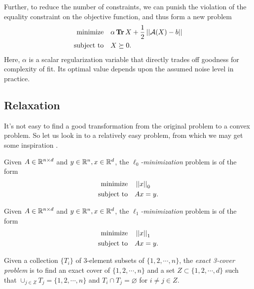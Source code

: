 \documentclass[11pt]{article}
\begin{document}
Further, to reduce the number of constraints, we can punish the violation of the equality constraint on the objective function, and thus form a new problem
\[\begin{aligned}
    \textnormal{minimize}\quad & \alpha\operatorname{\mathbf{Tr}} X+\frac12\left|\left|\mathcal A(X)-b\right|\right|\\
    \textnormal{subject to}\quad & X\succeq 0.
\end{aligned}\]
Here, \(\alpha\) is a scalar regularization variable that directly trades off goodness for complexity of fit. Its optimal value depends upon the assumed noise level in practice.

\subsection{Relaxation}

It's not easy to find a good transformation from the original problem to a convex problem. So let us look in to a relatively easy problem, from which we may get some inspiration \cite{horstmeyer2015solving}.

\begin{definition}
    Given \(A\in\mathbb R^{n\times d}\) and \(y\in\mathbb R^n,x\in\mathbb R^d\), the \emph{\(\ell_0\)-minimization} problem is of the form
    \[\begin{aligned}
        \textnormal{minimize}\quad & \left|\left|x\right|\right|_0\\
        \textnormal{subject to}\quad & Ax=y.
    \end{aligned}\]
\end{definition}

\begin{definition}
    Given \(A\in\mathbb R^{n\times d}\) and \(y\in\mathbb R^n,x\in\mathbb R^d\), the \emph{\(\ell_1\)-minimization} problem is of the form
    \[\begin{aligned}
        \textnormal{minimize}\quad & \left|\left|x\right|\right|_1\\
        \textnormal{subject to}\quad & Ax=y.
    \end{aligned}\]
\end{definition}

\begin{problem}\label{prb:exact-three-cover}
    Given a collection \(\{T_i\}\) of 3-element subsets of \(\{1,2,\cdots,n\}\), the \emph{exact 3-cover problem} is to find an exact cover of \(\{1,2,\cdots,n\}\) and a set \(Z \subset \{1,2,\cdots,d\}\) such that \(\cup_{j \in Z}T_j = \{1,2,\cdots,n\}\) and \(T_i \cap T_j = \varnothing\) for \(i\neq j\in Z\).
\end{problem}
\end{document}
